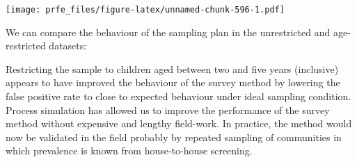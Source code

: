 \documentclass[
  12pt,
  a4paper]{book}
\newenvironment{Shaded}{\begin{snugshade}}{\end{snugshade}}
\newcommand{\AttributeTok}[1]{\textcolor[rgb]{0.77,0.63,0.00}{#1}}
\newcommand{\ConstantTok}[1]{\textcolor[rgb]{0.00,0.00,0.00}{#1}}
\newcommand{\DecValTok}[1]{\textcolor[rgb]{0.00,0.00,0.81}{#1}}
\newcommand{\FloatTok}[1]{\textcolor[rgb]{0.00,0.00,0.81}{#1}}
\newcommand{\FunctionTok}[1]{\textcolor[rgb]{0.00,0.00,0.00}{#1}}
\newcommand{\NormalTok}[1]{#1}
\newcommand{\SpecialCharTok}[1]{\textcolor[rgb]{0.00,0.00,0.00}{#1}}
\newcommand{\StringTok}[1]{\textcolor[rgb]{0.31,0.60,0.02}{#1}}
\begin{document}
\texttt{[image: prfe\_files/figure-latex/unnamed-chunk-596-1.pdf]}

We can compare the behaviour of the sampling plan in the unrestricted and age-restricted datasets:

\begin{Shaded}
\end{Shaded}

Restricting the sample to children aged between two and five years (inclusive) appears to have improved the behaviour of the survey method by lowering the false positive rate to close to expected behaviour under ideal sampling condition. Process simulation has allowed us to improve the performance of the survey method without expensive and lengthy field-work. In practice, the method would now be validated in the field probably by repeated sampling of communities in which prevalence is known from house-to-house screening.
\end{document}
